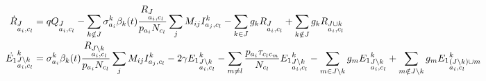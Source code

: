 \documentclass[12pt]{article}
\begin{document}
\begin{footnotesize}
\begin{align}
  \label{eq:full}
\dot{R}_{\begin{subarray}{l}J\\ a_i, c_l \end{subarray}} &=  q Q_{\begin{subarray}{l}J  \\ a_i,
    c_l \end{subarray}} - \sum_{k \notin J} \sigma_{a_i}^k \beta_k(t)
\frac{R_{\begin{subarray}{l}J\\ a_i, c_l \end{subarray}}}{p_{a_i} N_{c_l}} \sum_j M_{ij}
I^k_{a_j,c_l} -\sum_{k
  \in J} g_k R_{\begin{subarray}{l}J\\ a_i, c_l \end{subarray}} + \sum_{k
  \notin J} g_k R_{\begin{subarray}{l}J \cup k \\ a_i, c_l \end{subarray}} \notag \\
\dot{E_1}^k_{\begin{subarray}{l}J \setminus k\\ a_i,
    c_l \end{subarray}} &=\sigma_{a_i}^k \beta_k(t)
\frac{R_{\begin{subarray}{l}J \setminus k\\ a_i, c_l \end{subarray}}}{p_{a_i} N_{c_l}} \sum_j M_{ij}
I^k_{a_j,c_l} -2 \gamma {E_1}^k_{\begin{subarray}{l}J
    \setminus k\\ a_i, c_l \end{subarray}} -\sum_{m\neq l}
\frac{p_{a_i} \tau_{c_lc_m}}{N_{c_l}} {E_1}^k_{\begin{subarray}{l}J \setminus k\\ a_i,
    c_l \end{subarray}} -\sum_{m
  \in J \setminus k} g_m {E_1}^k_{\begin{subarray}{l}J \setminus k\\ a_i, c_l \end{subarray}} + \sum_{m
  \notin J \setminus k} g_m {E_1}^k_{\begin{subarray}{l} (J \setminus k) \cup m \\ a_i, c_l \end{subarray}} 
\notag \\

\end{align}
\end{footnotesize}
\end{document}
